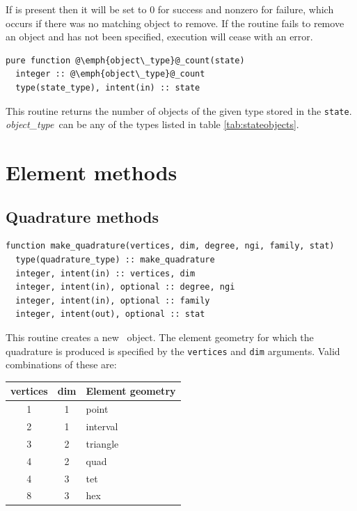 \documentclass[a4paper, 11pt]{book}
\begin{document}
If \stat is present then it will be set to 0 for success and nonzero for
failure, which occurs if there was no matching object to remove. If the
routine fails to remove an object and \stat has not been specified,
execution will cease with an error. 


\begin{lstlisting}
pure function @\emph{object\_type}@_count(state)
  integer :: @\emph{object\_type}@_count
  type(state_type), intent(in) :: state
\end{lstlisting}

This routine returns the number of objects of the given type stored in the
\lstinline+state+. \emph{object\_type}\ can be any of the types listed in
table \ref{tab:stateobjects}.

\chapter{Element methods}

\section{Quadrature methods}


\begin{lstlisting}
function make_quadrature(vertices, dim, degree, ngi, family, stat)
  type(quadrature_type) :: make_quadrature
  integer, intent(in) :: vertices, dim
  integer, intent(in), optional :: degree, ngi
  integer, intent(in), optional :: family
  integer, intent(out), optional :: stat  
\end{lstlisting}

This routine creates a new \quadraturetype\ object. The element geometry for
which the quadrature is produced is specified by the \lstinline+vertices+
and \lstinline+dim+ arguments. Valid combinations of these are:

\begin{center}
  \begin{tabular}{ccl}
    \textbf{vertices} & \textbf{dim} & \textbf{Element geometry}\\\hline
    1 & 1 & point\\
    2 & 1 & interval\\
    3 & 2 & triangle\\
    4 & 2 & quad\\
    4 & 3 & tet\\
    8 & 3 & hex
  \end{tabular}
\end{center}
\end{document}
